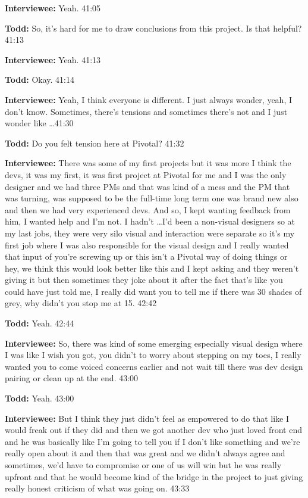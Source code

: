 \textbf{Interviewee:} Yeah.  41:05

\textbf{Todd:} So, it's hard for me to draw conclusions from this project.  Is that helpful?  41:13

\textbf{Interviewee:} Yeah.  41:13

\textbf{Todd:} Okay.  41:14

\textbf{Interviewee:} Yeah, I think everyone is different.  I just always wonder, yeah, I don't know.  Sometimes, there's tensions and sometimes there's not and I just wonder like \ldots 41:30

\textbf{Todd:} Do you felt tension here at Pivotal?  41:32

\textbf{Interviewee:} There was some of my first projects but it was more I think the devs, it was my first, it was first project at Pivotal for me and I was the only designer and we had three PMs and that was kind of a mess and the PM that was turning, was supposed to be the full-time long term one was brand new also and then we had very experienced devs.  And so, I kept wanting feedback from him, I wanted help and I'm not.  I hadn't \ldots I'd been a non-visual designers so at my last jobs, they were very silo visual and interaction were separate so it's my first job where I was also responsible for the visual design and I really wanted that input of you're screwing up or this isn't a Pivotal way of doing things or hey, we think this would look better like this and I kept asking and they weren't giving it but then sometimes they joke about it after the fact that's like you could have just told me, I really did want you to tell me if there was 30 shades of grey, why didn't you stop me at 15.  42:42

\textbf{Todd:} Yeah.  42:44

\textbf{Interviewee:} So, there was kind of some emerging especially visual design where I was like I wish you got, you didn't to worry about stepping on my toes, I really wanted you to come voiced concerns earlier and not wait till there was dev design pairing or clean up at the end.  43:00

\textbf{Todd:} Yeah.  43:00

\textbf{Interviewee:} But I think they just didn't feel as empowered to do that like I would freak out if they did and then we got another dev who just loved front end and he was basically like I'm going to tell you if I don't like something and we're really open about it and then that was great and we didn't always agree and sometimes, we'd have to compromise or one of us will win but he was really upfront and that he would become kind of the bridge in the project to just giving really honest criticism of what was going on.  43:33

